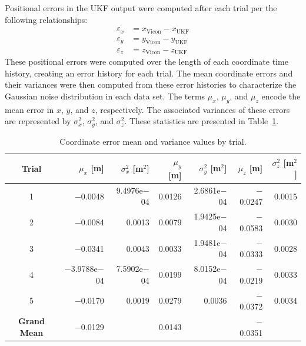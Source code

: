 Positional errors in the UKF output were computed after each trial per the following relationships:
%
\begin{align}
\varepsilon_{x} &= x_{\text{Vicon}} - x_{\text{UKF}} \\
\varepsilon_{y} &= y_{\text{Vicon}} - y_{\text{UKF}} \\
\varepsilon_{z} &= z_{\text{Vicon}} - z_{\text{UKF}}
\end{align}
%
These positional errors were computed over the length of each coordinate time history, creating an error history for each trial. The mean coordinate errors and their variances were then computed from these error histories to characterize the Gaussian noise distribution in each data set. The terms $\mu_{x}$, $\mu_{y}$, and $\mu_{z}$ encode the mean error in $x$, $y$, and $z$, respectively. The associated variances of these errors are represented by $\sigma_{x}^{2}$, $\sigma_{y}^{2}$, and $\sigma_{z}^{2}$. These statistics are presented in Table~\ref{tab:means_and_vars}.

\begin{table}[h]\centering
\caption[Coordinate Error]{Coordinate error mean and variance values by trial.}
\begin{tabular}[c]{crr|rr|rr}
\toprule
Trial & $\mu_{x}$ [m] & $\sigma_{x}^{2}$ [m$^{2}$] & $\mu_{y}$ [m] & $\sigma_{y}^{2}$ [m$^{2}$] & $\mu_{z}$ [m] & $\sigma_{z}^{2}$ [m$^{2}$] \\
\hline
1 & $-$0.0048 & 9.4976e$-$04 & 0.0126 & 2.6861e$-$04 & $-$0.0247 & 0.0015 \\
2 & $-$0.0084 & 0.0013 & 0.0079 & 1.9425e$-$04 & $-$0.0583 & 0.0030 \\
3 & $-$0.0341 & 0.0043 & 0.0033 & 1.9481e$-$04 & $-$0.0333 & 0.0028 \\
4 & $-$3.9788e$-$04 & 7.5902e$-$04 & 0.0199 & 8.0152e$-$04 & $-$0.0219 & 0.0033 \\
5 & $-$0.0170 & 0.0019 & 0.0279 & 0.0036 & $-$0.0372 & 0.0034 \\
\hline
\textbf{Grand Mean} & $-$0.0129 &  & 0.0143 &  & $-$0.0351 & \\
\bottomrule
\end{tabular}
\label{tab:means_and_vars}
\end{table}

